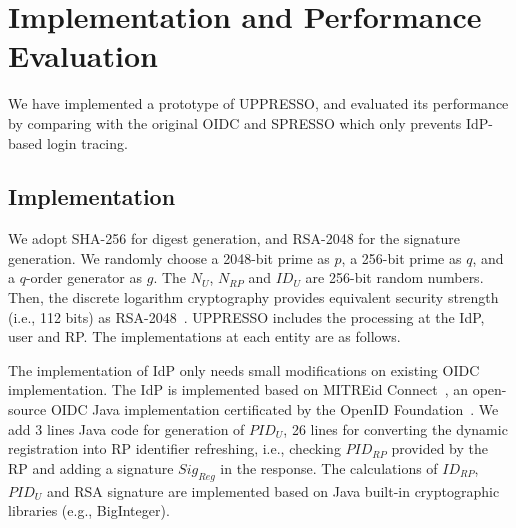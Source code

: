 \section{Implementation and Performance Evaluation}
\label{sec:implementation}
We have implemented a prototype of UPPRESSO, and evaluated its performance by comparing with the original OIDC and SPRESSO which only prevents IdP-based login tracing.

\subsection{Implementation}
We adopt SHA-256 for digest generation, and  RSA-2048 for the signature generation. %
We randomly choose a 2048-bit prime as $p$, a 256-bit prime as $q$, and a  $q$-order generator as $g$. The  $N_U$, $N_{RP}$ and $ID_U$  are 256-bit random numbers. Then, the discrete logarithm cryptography  provides equivalent security strength (i.e., 112 bits) as RSA-2048~\cite{barkerecommendation}.
UPPRESSO includes the processing at the IdP, user and RP. The implementations at each entity are as follows.

The implementation of IdP only needs small modifications on existing OIDC implementation. The IdP is implemented based on MITREid Connect~\cite{MITREid}, an open-source OIDC Java implementation certificated by the OpenID Foundation~\cite{OIDF}.
We add 3 lines Java code for generation of $PID_U$, 26 lines for converting the dynamic registration into RP identifier refreshing, i.e., checking $PID_{RP}$ provided by the RP and adding a signature $Sig_{Reg}$ in the response.  %
The calculations of $ID_{RP}$, $PID_U$ and RSA signature are implemented based on Java built-in cryptographic libraries (e.g., BigInteger).

